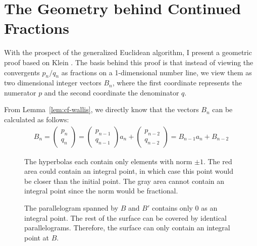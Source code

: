 \section{The Geometry behind Continued Fractions}

With the prospect of the generalized Euclidean algorithm, I present a geometric
proof based on Klein \cite{Klein95}.
The basis behind this proof is that instead of viewing the convergents $p_n/q_n$ as
fractions on a 1-dimensional number line,
we view them as two dimensional integer vectors $B_n$, where the first coordinate
represents the numerator $p$ and the second coordinate the denominator $q$.

From Lemma~\ref{lem:cf-wallis},
we directly know that the vectors $B_n$ can be calculated as follows:
\begin{align*}
  B_n =
  \begin{pmatrix}
    p_n \\ q_n
  \end{pmatrix}
  =
  \begin{pmatrix}
    p_{n-1} \\ q_{n-1}
  \end{pmatrix}
  a_n
  +
  \begin{pmatrix}
    p_{n-2} \\ q_{n-2}
  \end{pmatrix}
  = B_{n-1} a_n + B_{n-2}
\end{align*}

\begin{figure}[tb]
  \centering
  
  \caption{
    The hyperbolas each contain only elements with norm $±1$.
    The red area could contain an integral point, in which case this point
    would be closer than the initial point.
    The gray area cannot contain an integral point since the norm would be
    fractional.
  }
\end{figure}

\begin{figure}[tb]
  \centering
  
  \caption{
    The parallelogram spanned by $B$ and $B'$ contains only $0$ as an integral point.
    The rest of the surface can be covered by identical parallelograms.
    Therefore, the surface can only contain an integral point at $B$.
  }
\end{figure}

